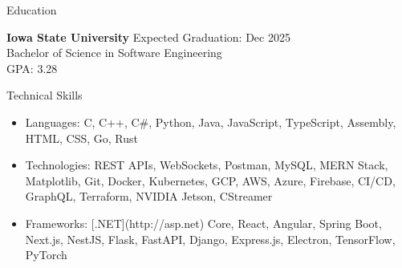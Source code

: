 \documentclass{resume}
\begin{document}
\begin{rSection}{Education}

{\bf Iowa State University} \hfill {Expected Graduation: Dec 2025}\\
Bachelor of Science in Software Engineering \\
GPA: 3.28

\end{rSection}


\begin{rSection}{Technical Skills}
\begin{itemize}
    \item Languages: C, C++, C\#, Python, Java, JavaScript, TypeScript, Assembly, HTML, CSS, Go, Rust
    \item Technologies: REST APIs, WebSockets, Postman, MySQL, MERN Stack, Matplotlib, Git, Docker, Kubernetes, GCP, AWS, Azure, Firebase, CI/CD, GraphQL, Terraform, NVIDIA Jetson, CStreamer
    \item Frameworks: [.NET](http://asp.net) Core, React, Angular, Spring Boot, Next.js, NestJS, Flask, FastAPI, Django, Express.js, Electron, TensorFlow, PyTorch
\end{itemize}
\end{rSection}
\end{document}
